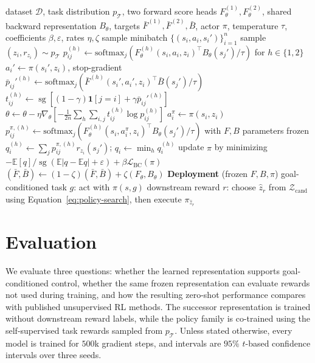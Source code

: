 \documentclass[11pt]{article}
\newcommand{\sg}{\operatorname{sg}}
\begin{document}
\begin{algorithm}[h]
\caption{Density-FB}
\label{alg:dfb}
\begin{algorithmic}[1]
\Require dataset $\mathcal D$, task distribution $p_{\mathcal T}$, two forward score heads $F_\theta^{(1)},F_\theta^{(2)}$, shared backward representation $B_\theta$, targets $\bar F^{(1)},\bar F^{(2)},\bar B$, actor $\pi$, temperature $\tau$, coefficients $\beta,\varepsilon$, rates $\eta,\zeta$
    \State sample minibatch $\{(s_i,a_i,s_i')\}_{i=1}^{n}$
    \State sample $(z_i,r_{z_i})\sim p_{\mathcal T}$
    \State $p_{ij}^{(h)}\gets\mathrm{softmax}_j\!\left(F_\theta^{(h)}(s_i,a_i,z_i)^\top B_\theta(s_j')/\tau\right)$ for $h\in\{1,2\}$
    \State $a_i'\gets\pi(s_i',z_i)$, stop-gradient
    \State $\bar p_{ij}'^{(h)}\gets\mathrm{softmax}_j\!\left(\bar F^{(h)}(s_i',a_i',z_i)^\top\bar B(s_j')/\tau\right)$
    \State $t_{ij}^{(h)}\gets\sg\!\left[(1-\gamma)\mathbf 1[j=i]+\gamma\bar p_{ij}'^{(h)}\right]$
    \State $\theta\gets\theta-\eta\nabla_\theta\left[-\frac{1}{2n}\sum_h\sum_{i,j}t_{ij}^{(h)}\log p_{ij}^{(h)}\right]$
    \State $a_i^\pi\gets\pi(s_i,z_i)$
    \State $p_{ij}^{\pi,(h)}\gets\mathrm{softmax}_j\!\left(F_\theta^{(h)}(s_i,a_i^\pi,z_i)^\top B_\theta(s_j')/\tau\right)$ with $F,B$ parameters frozen
    \State $q_i^{(h)}\gets\sum_jp_{ij}^{\pi,(h)}r_{z_i}(s_j')$; $q_i\gets\min_h q_i^{(h)}$
    \State update $\pi$ by minimizing $-\mathbb E[q]/\sg(\mathbb E|q-\mathbb E q|+\varepsilon)+\beta\mathcal L_{\mathrm{BC}}(\pi)$
    \State $(\bar F,\bar B)\gets(1-\zeta)(\bar F,\bar B)+\zeta(F_\theta,B_\theta)$
\EndFor
\Statex \textbf{Deployment} (frozen $F,B,\pi$)
\State goal-conditioned task $g$: act with $\pi(s,g)$
\State downstream reward $r$: choose $\hat z_r$ from $\mathcal Z_{\mathrm{cand}}$ using Equation~\eqref{eq:policy-search}, then execute $\pi_{\hat z_r}$
\end{algorithmic}
\end{algorithm}



\section{Evaluation}


We evaluate three questions: whether the learned representation supports goal-conditioned control, whether the same frozen representation can evaluate rewards not used during training, and how the resulting zero-shot performance compares with published unsupervised RL methods. The successor representation is trained without downstream reward labels, while the policy family is co-trained using the self-supervised task rewards sampled from $p_{\mathcal T}$. Unless stated otherwise, every model is trained for $500$k gradient steps, and intervals are $95\%$ $t$-based confidence intervals over three seeds.
\end{document}
